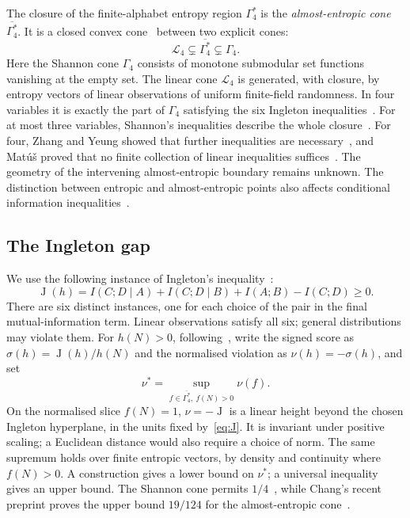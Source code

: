 \documentclass[a4paper,11pt]{article}
\newcommand{\AEcone}{\overline{\Gamma_4^{*}}}
\newcommand{\Ing}{\operatorname{J}}
\begin{document}
The closure of the finite-alphabet entropy region $\Gamma_4^*$ is the
\emph{almost-entropic cone} $\AEcone$. It is a closed convex cone~\cite{ZY}
between two explicit cones:
\[
 \mathcal L_4\subsetneq\AEcone\subsetneq\Gamma_4.
\]
Here the Shannon cone $\Gamma_4$ consists of monotone submodular set
functions vanishing at the empty set. The linear cone $\mathcal L_4$
is generated, with closure, by entropy vectors of linear observations
of uniform finite-field randomness. In four variables it is exactly the
part of $\Gamma_4$ satisfying the six Ingleton inequalities~\cite{MS95,HRSV00}.
For at most three variables, Shannon's inequalities describe the whole
closure~\cite{ZY}. For four, Zhang and Yeung showed that further
inequalities are necessary~\cite{ZY98}, and Mat\'u\v{s} proved that no
finite collection of linear inequalities suffices~\cite{MatusInfinite}.
The geometry of the intervening almost-entropic boundary remains unknown.
The distinction between entropic and almost-entropic points also affects
conditional information inequalities~\cite{KR}.

\subsection{The Ingleton gap}
We use the following instance of Ingleton's inequality~\cite{Ingleton71}:
\begin{equation}\label{eq:J}
 \Ing(h)=I(C;D\mid A)+I(C;D\mid B)+I(A;B)-I(C;D)\ge0.
\end{equation}
There are six distinct instances, one for each choice of the pair in
the final mutual-information term. Linear observations satisfy all six;
general distributions may violate them.
For $h(N)>0$, following~\cite[Definition~3]{DFZ}, write the signed score as
$\sigma(h)=\Ing(h)/h(N)$ and the normalised violation as
$\nu(h)=-\sigma(h)$, and set
\begin{equation}\label{eq:extremum}
 \nu^*=\sup_{f\in\AEcone,\ f(N)>0}\nu(f).
\end{equation}
On the normalised slice $f(N)=1$, $\nu=-\Ing$ is a linear height beyond
the chosen Ingleton hyperplane, in the units fixed by~\eqref{eq:J}.
It is invariant under positive scaling; a Euclidean distance would also
require a choice of norm. The same supremum holds over finite entropic
vectors, by density and continuity where $f(N)>0$.
A construction gives a lower bound on $\nu^*$; a universal inequality
gives an upper bound. The Shannon cone permits $1/4$~\cite{DFZ}, while
Chang's recent preprint proves the upper bound $19/124$ for the
almost-entropic cone~\cite{Chang}.
\end{document}

